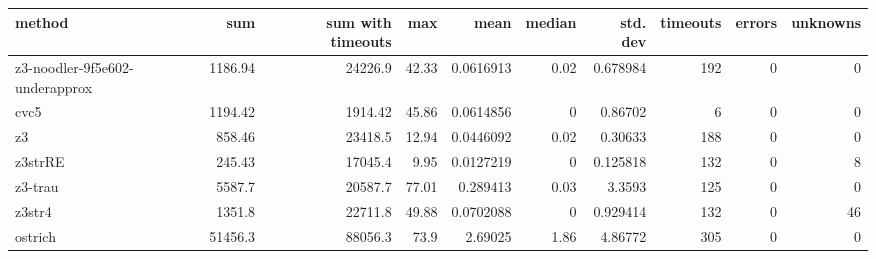 \begin{tabular}{lrrrrrrrrr}
\hline
 method                         &      sum &   sum with timeouts &   max &      mean &   median &   std. dev &   timeouts &   errors &   unknowns \\
\hline
 z3-noodler-9f5e602-underapprox &  1186.94 &            24226.9  & 42.33 & 0.0616913 &     0.02 &   0.678984 &        192 &        0 &          0 \\
 cvc5                           &  1194.42 &             1914.42 & 45.86 & 0.0614856 &     0    &   0.86702  &          6 &        0 &          0 \\
 z3                             &   858.46 &            23418.5  & 12.94 & 0.0446092 &     0.02 &   0.30633  &        188 &        0 &          0 \\
 z3strRE                        &   245.43 &            17045.4  &  9.95 & 0.0127219 &     0    &   0.125818 &        132 &        0 &          8 \\
 z3-trau                        &  5587.7  &            20587.7  & 77.01 & 0.289413  &     0.03 &   3.3593   &        125 &        0 &          0 \\
 z3str4                         &  1351.8  &            22711.8  & 49.88 & 0.0702088 &     0    &   0.929414 &        132 &        0 &         46 \\
 ostrich                        & 51456.3  &            88056.3  & 73.9  & 2.69025   &     1.86 &   4.86772  &        305 &        0 &          0 \\
\hline
\end{tabular}
